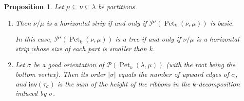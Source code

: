\documentclass[pdflatex,sn-mathphys-num]{sn-jnl}%
\theoremstyle{thmstyleone}%
\newtheorem{proposition}[theorem]{Proposition}
\theoremstyle{thmstyletwo}%
\theoremstyle{thmstylethree}%
\numberwithin{equation}{section}
\DeclareMathOperator{\Pet}{Pet}
\newcommand{\inv}{\mathsf{inv}}
\begin{document}
    \begin{proposition}\label{prop:initial}
        Let $\mu\subseteq \nu\subseteq \lambda$ be partitions. 
        \begin{enumerate}
            \item Then $\nu/\mu$ is a horizontal strip if and only if $\mathcal{P}'(\Pet_k(\nu,\mu))$ is basic. 
            
            In this case, $\mathcal{P}'(\Pet_k(\nu,\mu))$ is a tree if and only if $\nu/\mu$ is a horizontal strip whose size of each part is smaller than $k$.
            \item Let $\sigma$ be a good orientation of $\mathcal{P}(\Pet_k(\lambda,\mu))$ (with the root being the bottom vertex). Then its order $|\sigma|$ equals the number of upward edges of $\sigma$, and $\inv(\tau_\sigma)$ is the sum of the height of the ribbons in the $k$-decomposition induced by $\sigma$.
        \end{enumerate}
    \end{proposition}
\end{document}
